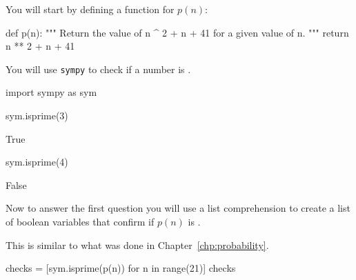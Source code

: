 You will start by defining a function for \(p(n)\):




\begin{pyin}
def p(n):
    """
    Return the value of n ^ 2 + n + 41 for a given value of n.
    """
    return n ** 2 + n + 41
\end{pyin}





You will use \texttt{sympy} to check if a number is .




\begin{pyin}
import sympy as sym

sym.isprime(3)
\end{pyin}





\begin{raw}
True
\end{raw}







\begin{pyin}
sym.isprime(4)
\end{pyin}





\begin{raw}
False
\end{raw}

Now to answer the first question you will use a list comprehension to create a
list of boolean variables that confirm if \(p(n)\) is .

\begin{note}
This is similar to what was done in Chapter~\ref{chp:probability}.
\end{note}


\begin{pyin}
checks = [sym.isprime(p(n)) for n in range(21)]
checks
\end{pyin}





\begin{raw}
\end{raw}





